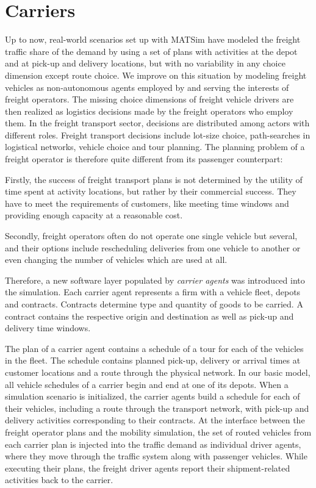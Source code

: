 \section{Carriers}
\label{sec:carriers}
Up to now, real-world scenarios set up with MATSim have modeled the freight traffic share of the demand by using a set of plans with activities at the depot and at pick-up and delivery locations, but with no variability in any choice dimension except route choice. We improve on this situation by modeling freight vehicles as non-autonomous agents employed by and serving the interests of freight operators. The missing choice dimensions of freight vehicle drivers are then realized as logistics decisions made by the freight operators who employ them. In the freight transport sector, decisions are distributed among actors with different roles. Freight transport decisions include lot-size choice, path-searches in logistical networks, vehicle choice and tour planning. The planning problem of a freight operator is therefore quite different from its passenger counterpart:

Firstly, the success of freight transport plans is not determined by the utility of time
spent at activity locations, but rather by their commercial success. They have to meet the
requirements of customers, like meeting time windows and providing enough capacity at
a reasonable cost.

Secondly, freight operators often do not operate one single vehicle but several, and their
options include rescheduling deliveries from one vehicle to another or even changing the
number of vehicles which are used at all.

Therefore, a new software layer populated by \emph{carrier agents} was introduced into the
simulation. Each carrier agent represents a firm with a vehicle fleet, depots and contracts.
Contracts determine type and quantity of goods to be carried. A contract contains the respective 
origin and destination as well as pick-up and delivery time windows.

The plan of a carrier agent contains a schedule of a tour for each of the vehicles in the fleet. 
The schedule contains planned pick-up, delivery or arrival times at customer locations and a route through 
the physical network. In our basic model, all vehicle schedules of a carrier begin and end at one of its depots.
When a simulation scenario is initialized, the carrier agents build a schedule for each of their vehicles, 
including a route through the transport network, with pick-up and delivery activities corresponding to their contracts.
At the interface between the freight operator plans and the mobility simulation, the set of routed vehicles 
from each carrier plan is injected into the traffic demand as individual driver agents, where they move 
through the traffic system along with passenger vehicles. While executing their plans, the freight driver 
agents report their shipment-related activities back to the carrier.

